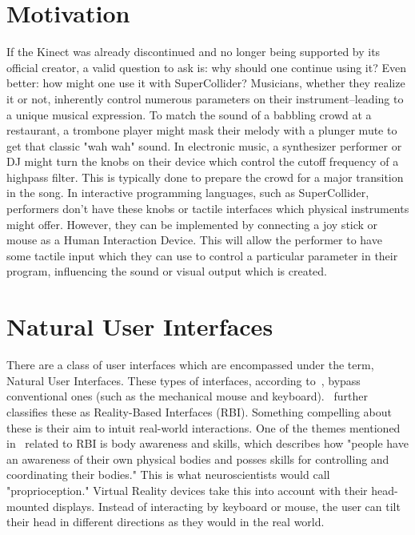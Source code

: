\documentclass{article}
\begin{document}
\section{Motivation}\label{sec:motivation}
If the Kinect was already discontinued and no longer being supported by its official creator, a valid question to ask is: why should one continue using it? Even better: how might one use it with SuperCollider? Musicians, whether they realize it or not, inherently control numerous parameters on their instrument--leading to a unique musical expression. To match the sound of a babbling crowd at a restaurant, a trombone player might mask their melody with a plunger mute to get that classic "wah wah" sound. In electronic music, a synthesizer performer or DJ might turn the knobs on their device which control the cutoff frequency of a highpass filter. This is typically done to prepare the crowd for a major transition in the song. In interactive programming languages, such as SuperCollider, performers don't have these knobs or tactile interfaces which physical instruments might offer. However, they can be implemented by connecting a joy stick or mouse as a Human Interaction Device. This will allow the performer to have some tactile input which they can use to control a particular parameter in their program, influencing the sound or visual output which is created.
\section{Natural User Interfaces}\label{sec:natural_user_interfaces}
There are a class of user interfaces which are encompassed under the term, Natural User Interfaces. These types of interfaces, according to~\cite{norman_natural_2010}, bypass conventional ones (such as the mechanical mouse and keyboard).~\cite{jacob_reality-based_2008} further classifies these as Reality-Based Interfaces (RBI). Something compelling about these is their aim to intuit real-world interactions. One of the themes mentioned in~\cite{jacob_reality-based_2008} related to RBI is body awareness and skills, which describes how "people have an awareness of their own physical bodies and posses skills for controlling and coordinating their bodies." This is what neuroscientists would call "proprioception." Virtual Reality devices take this into account with their head-mounted displays. Instead of interacting by keyboard or mouse, the user can tilt their head in different directions as they would in the real world.
\end{document}
